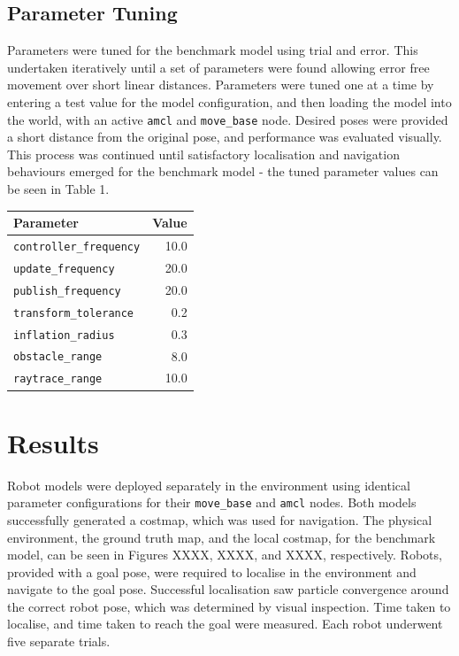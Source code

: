 \documentclass[a4paper]{article}
\begin{document}
\subsection{Parameter Tuning}
\begin{minipage}{0.55\textwidth}
Parameters were tuned for the benchmark model using trial and error. This undertaken iteratively until a set of parameters were found allowing error free movement over short linear distances. Parameters were tuned one at a time by entering a test value for the model configuration, and then loading the model into the world, with an active \texttt{amcl} and \texttt{move\_base} node. Desired poses were provided a short distance from the original pose, and performance was evaluated visually. This process was continued until satisfactory localisation and navigation behaviours emerged for the benchmark model - the tuned parameter values can be seen in Table 1.
\end{minipage}
\hspace{0.75cm}
\begin{minipage}{0.35\textwidth}
\centering
{}
\begin{tabular}{lr}
\toprule
\textbf{Parameter} & \textbf{Value}\\
\midrule
\texttt{controller\_frequency} & 10.0 \\
\texttt{update\_frequency} & 20.0 \\
\texttt{publish\_frequency} & 20.0 \\
\texttt{transform\_tolerance} & 0.2 \\
\texttt{inflation\_radius} & 0.3 \\
\texttt{obstacle\_range} & 8.0\\
\texttt{raytrace\_range} & 10.0\\
\bottomrule
\end{tabular}
\end{minipage}



\section{Results}
Robot models were deployed separately in the environment using identical parameter configurations for their \texttt{move\_base} and \texttt{amcl} nodes. Both models successfully generated a costmap, which was used for navigation. The physical environment, the ground truth map, and the local costmap, for the benchmark model, can be seen in Figures XXXX, XXXX, and XXXX, respectively. Robots, provided with a goal pose, were required to localise in the environment and navigate to the goal pose. Successful localisation saw particle convergence around the correct robot pose, which was determined by visual inspection. Time taken to localise, and time taken to reach the goal were measured. Each robot underwent five separate trials.\\
\end{document}

